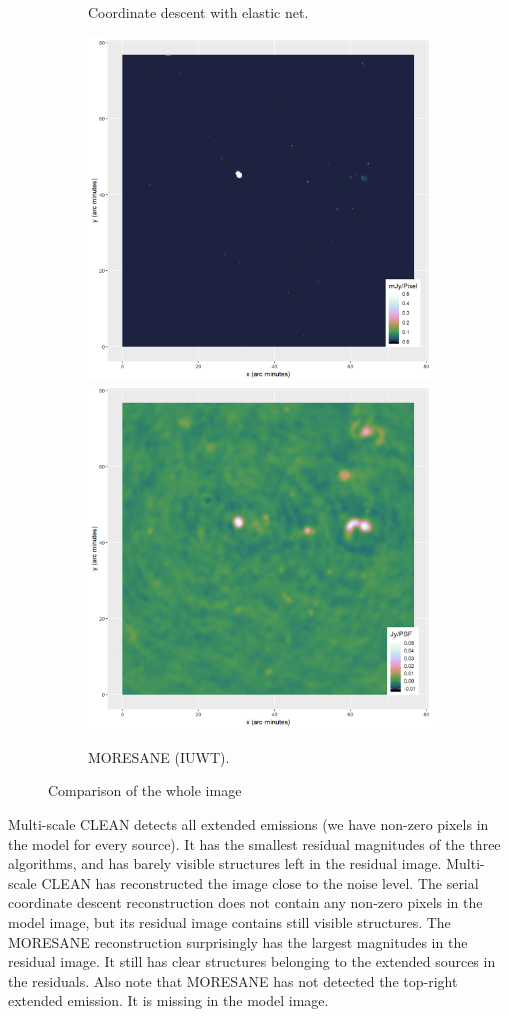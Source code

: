 \begin{figure}[!htp]
\begin{subfigure}[b]{0.82\linewidth}
		\caption{Coordinate descent with elastic net.}
		\label{results:comp:clean}
	\end{subfigure}
	\begin{subfigure}[b]{0.82\linewidth}
		\centering
		\includegraphics[width=0.490\linewidth]{./chapters/10.results/iuwt/iuwt-model.png}
		\includegraphics[width=0.490\linewidth]{./chapters/10.results/iuwt/iuwt-residuals.png}
		\caption{MORESANE (IUWT).}
		\label{results:comp:clean}
	\end{subfigure}

	\caption{Comparison of the whole image}
	\label{results:cleancomp:figure}
\end{figure}

\newpage

Multi-scale CLEAN detects all extended emissions (we have non-zero pixels in the model for every source). It has the smallest residual magnitudes of the three algorithms, and has barely visible structures left in the residual image. Multi-scale CLEAN has reconstructed the image close to the noise level. The serial coordinate descent reconstruction does not contain any non-zero pixels in the model image, but its residual image contains still visible structures. The MORESANE reconstruction surprisingly has the largest magnitudes in the residual image. It still has clear structures belonging to the extended sources in the residuals. Also note that MORESANE has not detected the top-right extended emission. It is missing in the model image.


